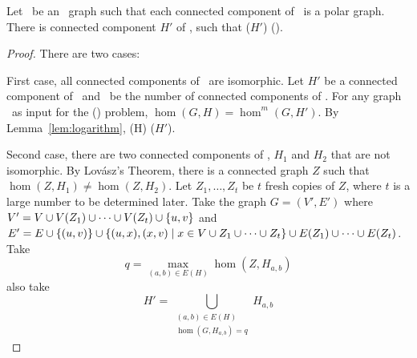 \begin{lemma} \label{lem:onecomp}
Let \mH\ be an \RBA\ graph such that each connected component of \mH\ is a polar graph.
There is connected component \(H'\) of \mH, such that \chom(\(H'\)) \maple \chom(\mH)\@.
\end{lemma}

\begin{proof}
There are two cases:

First case, all connected components of \mH\ are isomorphic.
Let \(H'\) be a connected component of \mH\ and
\mm\ be the number of connected components of \mH\@.
For any graph \mG\ as input for the \chom(\mH) problem, \(\hom(G,H)=\hom^m(G,H')\).
By Lemma~\ref{lem:logarithm}, \chom(H) \mapge \chom(\(H'\))\@.

Second case, there are two connected components of \mH, \(H_1\) and \(H_2\) that are not isomorphic.
By Lov\'{a}sz's Theorem, there is a connected graph \(Z\) such that \(\hom(Z,H_1) \neq \hom(Z,H_2)\)\@.
Let \(Z_1,\dotsc,Z_t\) be \(t\) fresh copies of \(Z\), where \(t\) is a large number to be 
determined later.
Take the graph \(G=(V',E')\) where \(V'=V \cup V(Z_1)\cup \dotsb \cup V(Z_t) \cup \{{u,v}\} \)
and \(E'=E \cup \{{(u,v)}\} \cup \{{(u,x),(x,v) \mid x \in V \cup  Z_1 \cup \dotsb \cup Z_t}\} \cup
E(Z_1)\cup \dotsb \cup E(Z_t)\)\@. Take \[q= \max \limits_{(a,b) \in E(H)} \hom(Z,H_{a,b})\] also 
take \[H'=\bigcup_{\substack{(a,b)\in E(H) \\ 
\hom(G,H_{a,b})=q}} H_{a,b}\]


\end{proof}
